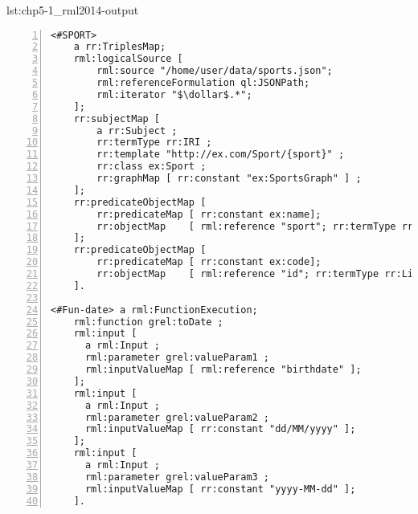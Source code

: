 \begin{captionedlisting}{lst:chp5-1_rml2014-output}
{\begin{lstlisting}[numbers=left,basicstyle=\ttfamily\small,columns=flexible]
<#SPORT>
    a rr:TriplesMap;
    rml:logicalSource [
    	rml:source "/home/user/data/sports.json";
    	rml:referenceFormulation ql:JSONPath;
        rml:iterator "$\dollar$.*";
    ];
    rr:subjectMap [
    	a rr:Subject ;
    	rr:termType rr:IRI ;
    	rr:template "http://ex.com/Sport/{sport}" ;
    	rr:class ex:Sport ;
    	rr:graphMap [ rr:constant "ex:SportsGraph" ] ;
    ];
    rr:predicateObjectMap [
    	rr:predicateMap	[ rr:constant ex:name];
    	rr:objectMap	[ rml:reference "sport"; rr:termType rr:Literal; rr:datatype xsd:string; rr:language "en" ]
    ];
    rr:predicateObjectMap [
    	rr:predicateMap	[ rr:constant ex:code];
    	rr:objectMap	[ rml:reference "id"; rr:termType rr:Literal; rr:datatype xsd:integer ]
    ].

<#Fun-date> a rml:FunctionExecution;
    rml:function grel:toDate ;
    rml:input [
      a rml:Input ;
      rml:parameter grel:valueParam1 ;
      rml:inputValueMap [ rml:reference "birthdate" ];
    ];
    rml:input [
      a rml:Input ;
      rml:parameter grel:valueParam2 ;
      rml:inputValueMap [ rr:constant "dd/MM/yyyy" ];
    ];
    rml:input [
      a rml:Input ;
      rml:parameter grel:valueParam3 ;
      rml:inputValueMap [ rr:constant "yyyy-MM-dd" ];
    ].
\end{lstlisting}}
\end{captionedlisting}

